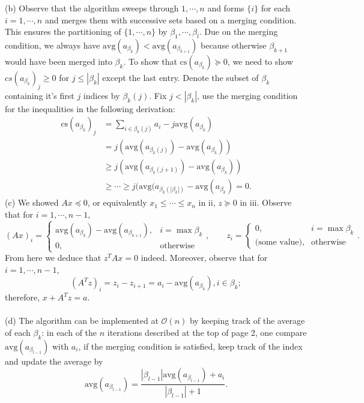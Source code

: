 \documentclass[12pt,a4paper]{article}
\renewcommand{\l}{\left}\renewcommand{\r}{\right}
\newcommand{\SUM}[2]{\sum\limits_{#1}^{#2}}
\begin{document}
\newcommand{\avg}{\mbox{avg}}
\newcommand{\cs}{\mbox{cs}}
\noindent(b) Observe that the algorithm sweeps through $1, \cdots, n$ and forms $\{i\}$ for each $i = 1, \cdots, n$ and merges them with successive sets based on a merging condition. This ensures the partitioning of $\{1, \cdots, n\}$ by $\beta_1, \cdots, \beta_l$. Due on the merging condition, we always have $\avg(a_{\beta_k}) < \avg(a_{\beta_{k+1}})$ because otherwise $\beta_{k+1}$ would have been merged into $\beta_k$. To show that $\cs(a_{\beta_k}) \succeq 0$, we need to show $cs(a_{\beta_k})_j \geq 0$ for $j \leq |\beta_k|$ except the last entry. Denote the subset of $\beta_k$ containing it's first $j$ indices by $\beta_k(j)$. Fix $j < |\beta_k|$, use the merging condition for the inequalities in the following derivation:
\begin{align*}
  \cs(a_{\beta_k})_j & = \SUM{i\in\beta_k(j)}{} a_i - j \avg(a_{\beta_k}) \\
                     & = j(\avg(a_{\beta_k(j)}) - \avg(a_{\beta_k})) \\
                     & \geq j(\avg(a_{\beta_k(j+1)}) - \avg(a_{\beta_k})) \\
                     & \geq \cdots \geq j(\avg(a_{\beta_k(|\beta_k|)} - \avg(a_{\beta_k}) = 0.
\end{align*}
(c) We showed $Ax\preceq 0$, or equivalently $x_1 \leq \cdots \leq x_n$ in ii, $z\succeq 0$ in iii. Observe that for $i = 1, \cdots, n-1$, 
$$(Ax)_i = \l\{
  \begin{array}{cl}
    \avg(a_{\beta_k}) - \avg(a_{\beta_{k+1}}),& i = \max\beta_k \\
    0,& \mbox{otherwise}
 \end{array} 
 \r., \qquad z_i = \l\{
   \begin{array}{cl}
     0,& i = \max\beta_k \\
     \mbox{(some value)},& \mbox{otherwise}
   \end{array}
   \r..$$
From here we deduce that $z^TAx = 0$ indeed. Moreover, observe that for $i = 1, \cdots, n-1$,
$$(A^Tz)_i = z_i - z_{i+1} = a_i - \avg(a_{\beta_k}), i \in \beta_k;$$
therefore, $x + A^Tz = a$. \\
\\
(d) The algorithm can be implemented at $\mathcal O(n)$ by keeping track of the average of each $\beta_k$: in each of the $n$ iterations described at the top of page 2, one compare $\avg(a_{\beta_{l-1}})$ with $a_i$, if the merging condition is satisfied, keep track of the index and update the average by 
$$\avg(a_{\beta_{l-1}}) = \frac{|\beta_{l-1}|\avg(a_{\beta_{l-1}}) + a_i}{|\beta_{l-1}| + 1}.$$
\end{document}
